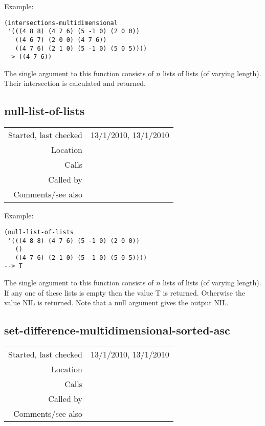 \vspace{0.5cm}
\noindent Example:
\begin{verbatim}
(intersections-multidimensional
 '(((4 8 8) (4 7 6) (5 -1 0) (2 0 0))
   ((4 6 7) (2 0 0) (4 7 6))
   ((4 7 6) (2 1 0) (5 -1 0) (5 0 5))))
--> ((4 7 6))
\end{verbatim}

\noindent The single argument to this function
consists of $n$ lists of lists (of varying length).
Their intersection is calculated and returned.


\subsection*{null-list-of-lists}\label{fun:null-list-of-lists}

\vspace{0.3cm}
\begin{tabular}{r|p{8cm}}
Started, last checked & 13/1/2010, 13/1/2010 \\
Location & \nameref{sec:set-operations} \\
Calls & \\
Called by & \nameref{fun:intersections-multidimensional} \\
Comments/see also & 
\end{tabular}

\vspace{0.5cm}
\noindent Example:
\begin{verbatim}
(null-list-of-lists
 '(((4 8 8) (4 7 6) (5 -1 0) (2 0 0))
   ()
   ((4 7 6) (2 1 0) (5 -1 0) (5 0 5))))
--> T
\end{verbatim}

\noindent The single argument to this function
consists of $n$ lists of lists (of varying length). If
any one of these lists is empty then the value T is
returned. Otherwise the value NIL is returned. Note
that a null argument gives the output NIL.


\subsection*{set-difference-multidimensional-sorted-asc}\label{fun:set-difference-multidimensional-sorted-asc}

\vspace{0.3cm}
\begin{tabular}{r|p{8cm}}
Started, last checked & 13/1/2010, 13/1/2010 \\
Location & \nameref{sec:set-operations} \\
Calls & \nameref{fun:test-equal<list-elements} \\
Called by & \\
Comments/see also & 
\end{tabular}

